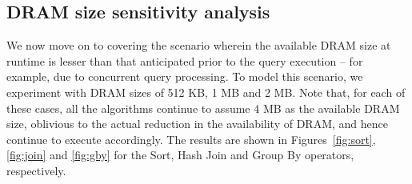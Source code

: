 \begin{comment}
Note that it is possible to achieve this lifetime only when the writes
are perfectly levelled across the entire PCM. In practice, however,
there is a degree of skewness in the writes of most algorithms. Due to
this skew, an algorithm might cut short the PCM lifetime considerably
despite doing well on the overall writes, since a particular set of
locations are written to repeatedly. Hence, characterizing the write
skew is fundamental to determining PCM durability.

As mentioned earlier, we track writes at the block level (256B) in our
modified simulator.  In Figure~\ref{fig:wear_dist}, we show the 
write frequencies of the top 100 blocks for the different operators.

As we can see, in the case of hash join, our PCM-conscious algorithms have
almost the same uniform distribution as the native algorithms. though the
initial part of the writes are slightly higher. This is in those cases
when the bitmap used for maintaining the slot occupancy information for
pages in the hash table is evicted intermediately between bit updates,
thereby incurring higher number of writes for that line.

For group-by (using sort), the per block writes due to our algorithms
are consistently lower than the native algorithms by about $39\%$. The
reason for this is that sorting incurs multiple writes for the same
block when all the input tuples cannot fit in DRAM, which the aspect of
partitioning saves in our PCM-conscious algorithms.

\begin{figure}[htbp]
	\psfig{figure=wear_dist.png, width = 9cm}\centering
	\caption{Operators Wear Distribution }
	\label{fig:wear_dist}
\end{figure} 
\end{comment}

\subsection{DRAM size sensitivity analysis}
We now move on to covering the scenario wherein the available DRAM
size at runtime is lesser than that anticipated prior to the query
execution -- for example, due to concurrent query processing. 
To model this scenario, we experiment with DRAM sizes of 512 KB, 1 MB and
2 MB. Note that, for each of these cases, all the algorithms continue to assume 4 MB as the available DRAM size, oblivious to the actual reduction in the availability of DRAM, and hence continue to execute accordingly. The results are shown in Figures~\ref{fig:sort}, \ref{fig:join}
and \ref{fig:gby} for the Sort, Hash Join and Group By operators, respectively.

